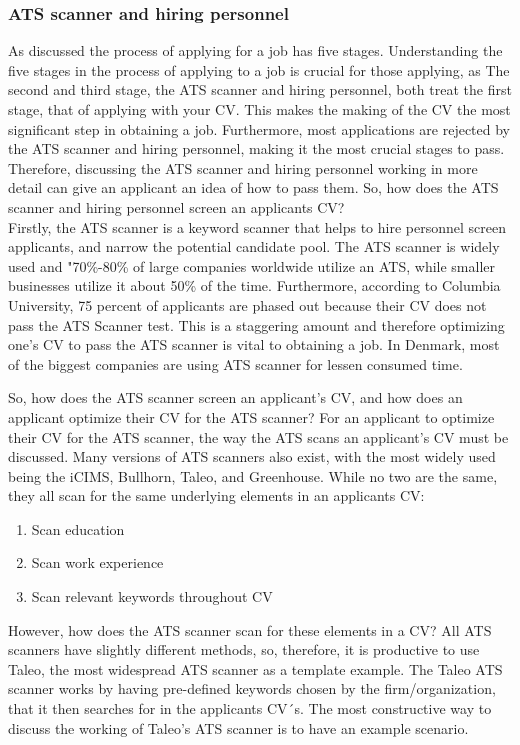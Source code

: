 \subsubsection{ATS scanner and hiring personnel} \label{ATS scanner and hiring personnel}
As discussed the process of applying for a job has five stages.
Understanding the five stages in the process of applying to a job is crucial for those applying, as 
The second and third stage, the ATS scanner and hiring personnel, both treat the first stage, that of applying with your CV.
This makes the making of the CV the most significant step in obtaining a job.
Furthermore, most applications are rejected by the ATS scanner and hiring personnel, making it the most crucial stages to pass.
Therefore, discussing the ATS scanner and hiring personnel working in more detail can give an applicant an idea of how to pass them.
So, how does the ATS scanner and hiring personnel screen an applicants CV? \\

Firstly, the ATS scanner is a keyword scanner that helps to hire personnel screen applicants, and narrow the potential candidate pool.
The ATS scanner is widely used and "70\%-80\% of large companies worldwide utilize an ATS, while smaller businesses utilize it about 50\% of the time.\cite{ATS_Usage}
Furthermore, according to Columbia University, 75 percent of applicants are phased out because their CV does not pass the ATS Scanner test.
This is a staggering amount and therefore optimizing one's CV to pass the ATS scanner is vital to obtaining a job.
In Denmark, most of the biggest companies are using ATS scanner for lessen consumed time.\cite{ATS_Denmark}

So, how does the ATS scanner screen an applicant's CV, and how does an applicant optimize their CV for the ATS scanner?
For an applicant to optimize their CV for the ATS scanner, the way the ATS scans an applicant's CV must be discussed.
Many versions of ATS scanners also exist, with the most widely used being the iCIMS, Bullhorn, Taleo, and Greenhouse.
While no two are the same, they all scan for the same underlying elements in an applicants CV:
\begin{enumerate}
   \item Scan education
   \item Scan work experience
   \item Scan relevant keywords throughout CV
\end{enumerate}
However, how does the ATS scanner scan for these elements in a CV?
All ATS scanners have slightly different methods, so, therefore, it is productive to use Taleo, the most widespread ATS scanner as a template example.
The Taleo ATS scanner works by having pre-defined keywords chosen by the firm/organization, that it then searches for in the applicants CV´s.\cite{ATS_Taleo}
The most constructive way to discuss the working of Taleo's ATS scanner is to have an example scenario. \\


